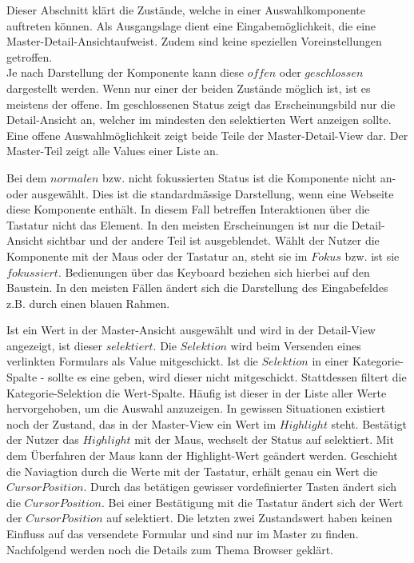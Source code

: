 Dieser Abschnitt klärt die Zustände, welche in einer Auswahlkomponente auftreten können.
Als Ausgangslage dient eine Eingabemöglichkeit, die eine Master-Detail-Ansicht\footnotemark aufweist.
Zudem sind keine speziellen Voreinstellungen getroffen.
\\
Je nach Darstellung der Komponente kann diese $offen$ oder $geschlossen$ dargestellt werden.
Wenn nur einer der beiden Zustände möglich ist, ist es meistens der offene.
Im geschlossenen Status zeigt das Erscheinungsbild nur die Detail-Ansicht an, welcher im mindesten den selektierten Wert anzeigen sollte.
Eine offene Auswahlmöglichkeit zeigt beide Teile der Master-Detail-View dar.
Der Master-Teil zeigt alle Values einer Liste an.

Bei dem $normalen$ bzw. nicht fokussierten Status ist die Komponente nicht an- oder ausgewählt.
Dies ist die standardmässige Darstellung, wenn eine Webseite diese Komponente enthält.
In diesem Fall betreffen Interaktionen über die Tastatur nicht das Element.
In den meisten Erscheinungen ist nur die Detail-Ansicht sichtbar und der andere Teil ist ausgeblendet.
Wählt der Nutzer die Komponente mit der Maus oder der Tastatur an, steht sie im $Fokus$ bzw. ist sie $fokussiert$.
Bedienungen über das Keyboard beziehen sich hierbei auf den Baustein.
In den meisten Fällen ändert sich die Darstellung des Eingabefeldes z.B. durch einen blauen Rahmen.

Ist ein Wert in der Master-Ansicht ausgewählt und wird in der Detail-View angezeigt, ist dieser $selektiert$.
Die $Selektion$ wird beim Versenden eines verlinkten Formulars als Value mitgeschickt.
Ist die $Selektion$ in einer Kategorie-Spalte - sollte es eine geben, wird dieser nicht mitgeschickt.
Stattdessen filtert die Kategorie-Selektion die Wert-Spalte.
Häufig ist dieser in der Liste aller Werte hervorgehoben, um die Auswahl anzuzeigen.
In gewissen Situationen existiert noch der Zustand, das in der Master-View ein Wert im $Highlight$ steht. 
Bestätigt der Nutzer das $Highlight$ mit der Maus, wechselt der Status auf selektiert.
Mit dem Überfahren der Maus kann der Highlight-Wert geändert werden.
Geschieht die Naviagtion durch die Werte mit der Tastatur, erhält genau ein Wert die $Cursor Position$. 
Durch das betätigen gewisser vordefinierter Tasten ändert sich die $Cursor Position$.
Bei einer Bestätigung mit die Tastatur ändert sich der Wert der $Cursor Position$ auf selektiert.
Die letzten zwei Zustandswert haben keinen Einfluss auf das versendete Formular und sind nur im Master zu finden.
Nachfolgend werden noch die Details zum Thema Browser geklärt.

